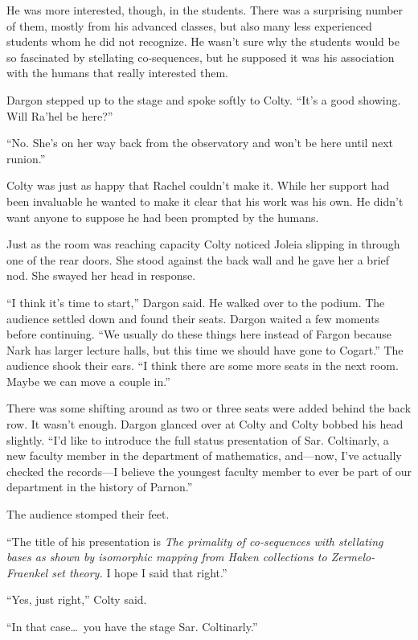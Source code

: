 He was more interested, though, in the students. There was a surprising number of them, mostly
from his advanced classes, but also many less experienced students whom he did not recognize. He
wasn't sure why the students would be so fascinated by stellating co-sequences, but he supposed
it was his association with the humans that really interested them.

Dargon stepped up to the stage and spoke softly to Colty. ``It's a good showing. Will Ra'hel be
here?''

``No. She's on her way back from the observatory and won't be here until next runion.''

Colty was just as happy that Rachel couldn't make it. While her support had been invaluable he
wanted to make it clear that his work was his own. He didn't want anyone to suppose he had been
prompted by the humans.

Just as the room was reaching capacity Colty noticed Joleia slipping in through one of the rear
doors. She stood against the back wall and he gave her a brief nod. She swayed her head in
response.

``I think it's time to start,'' Dargon said. He walked over to the podium. The audience settled
down and found their seats. Dargon waited a few moments before continuing. ``We usually do these
things here instead of Fargon because Nark has larger lecture halls, but this time we should
have gone to Cogart.'' The audience shook their ears. ``I think there are some more seats in the
next room. Maybe we can move a couple in.''

There was some shifting around as two or three seats were added behind the back row. It wasn't
enough. Dargon glanced over at Colty and Colty bobbed his head slightly. ``I'd like to introduce
the full status presentation of Sar. Coltinarly, a new faculty member in the department of
mathematics, and---now, I've actually checked the records---I believe the youngest faculty
member to ever be part of our department in the history of Parnon.''

The audience stomped their feet.

``The title of his presentation is \textit{The primality of co-sequences with stellating bases
  as shown by isomorphic mapping from Haken collections to Zermelo-Fraenkel set theory.} I hope
I said that right.''

``Yes, just right,'' Colty said.

``In that case\ldots\ you have the stage Sar. Coltinarly.''

